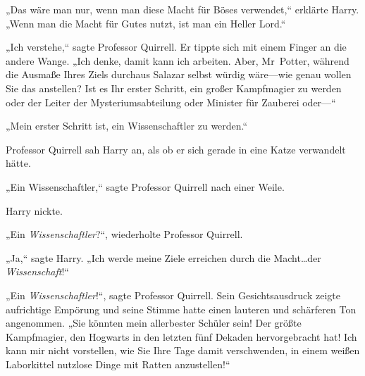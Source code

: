 „Das wäre man nur, wenn man diese Macht für Böses verwendet,“ erklärte Harry. „Wenn man die Macht für Gutes nutzt, ist man ein Heller Lord.“

„Ich verstehe,“ sagte Professor Quirrell. Er tippte sich mit einem Finger an die andere Wange. „Ich denke, damit kann ich arbeiten. Aber, Mr~Potter, während die Ausmaße Ihres Ziels durchaus Salazar selbst würdig wäre—wie genau wollen Sie das anstellen? Ist es Ihr erster Schritt, ein großer Kampfmagier zu werden oder der Leiter der Mysteriumsabteilung oder Minister für Zauberei oder—“

„Mein erster Schritt ist, ein Wissenschaftler zu werden.“

Professor Quirrell sah Harry an, als ob er sich gerade in eine Katze verwandelt hätte.

„Ein Wissenschaftler,“ sagte Professor Quirrell nach einer Weile.

Harry nickte.

„Ein \emph{Wissenschaftler}?“, wiederholte Professor Quirrell.

„Ja,“ sagte Harry. „Ich werde meine Ziele erreichen durch die Macht…der \emph{Wissenschaft}!“

„Ein \emph{Wissenschaftler}!“, sagte Professor Quirrell. Sein Gesichtsausdruck zeigte aufrichtige Empörung und seine Stimme hatte einen lauteren und schärferen Ton angenommen. „Sie könnten mein allerbester Schüler sein! Der größte Kampfmagier, den Hogwarts in den letzten fünf Dekaden hervorgebracht hat! Ich kann mir nicht vorstellen, wie Sie Ihre Tage damit verschwenden, in einem weißen Laborkittel nutzlose Dinge mit Ratten anzustellen!“

